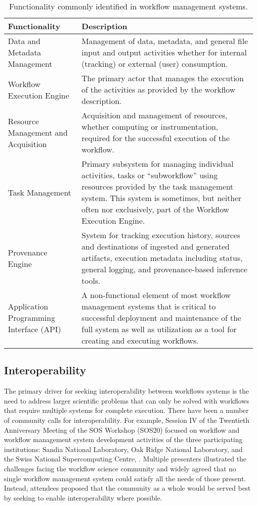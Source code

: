 \begin{table*}[h]
\begin{tabularx}{\textwidth}{|X|X|}
\hline
\textbf{Functionality} & \textbf{Description} \tabularnewline\hline
Data and Metadata Management & Management of data, metadata, and general file input and output activities whether for internal (tracking) or external (user) consumption.
 \tabularnewline\hline 
Workflow Execution Engine & The primary actor that manages the execution of the activities as provided by the workflow description. \tabularnewline\hline
Resource Management and Acquisition & Acquisition and management of resources, whether computing or instrumentation, required for the successful execution of the workflow. \tabularnewline\hline 
Task Management & Primary subsystem for managing individual activities, tasks or ``subworkflow'' using resources provided by the task management system. This system is sometimes, but neither often nor exclusively, part of the Workflow Execution Engine. \tabularnewline\hline
Provenance Engine & System for tracking execution history, sources and destinations of ingested and generated artifacts, execution metadata including status, general logging, and provenance-based inference tools. \tabularnewline\hline 
Application Programming Interface (API) & A non-functional element of most workflow management systems that is critical to successful deployment and maintenance of the full system as well as utilization as a tool for creating and executing workflows. \tabularnewline\hline
\end{tabularx}
\caption{Functionality commonly identified in workflow management systems.}
\label{blocks}
\end{table*}

\subsection{Interoperability}

The primary driver for seeking interoperability between workflows systems is the need to address larger scientific problems that can only be solved with workflows that require multiple systems for complete execution. There have been a number of community calls for interoperability. For example, Session IV of the Twentieth Anniversary Meeting of the SOS Workshop
(SOS20) focused on workflow and workflow management
system development activities of the three participating institutions: Sandia
National Laboratory, Oak Ridge National Laboratory, and the Swiss National Supercomputing
Centre, \cite{pack_sos20_2016}. Multiple
presenters illustrated the challenges facing the workflow science community and
widely agreed that no single workflow management system could satisfy
all the needs of those present. Instead, attendees proposed that the community as a whole would
be served best by seeking to enable interoperability where possible. 

